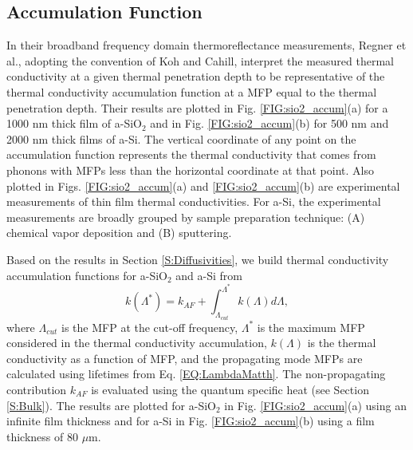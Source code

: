 \documentclass[aps,prb,twocolumn,superscriptaddress,footinbib,amsmath,amssymb,floatfix]{revtex4}
\begin{document}
\subsection{\label{S:Accumulation}Accumulation Function}

In their broadband frequency domain thermoreflectance 
measurements, Regner et al.,\cite{regner_broadband_2013}  
adopting the convention of Koh and Cahill,\cite{koh_frequency_2007} 
interpret the  
measured thermal conductivity at a given thermal penetration depth 
to be representative of the thermal conductivity accumulation 
function at a MFP equal to the thermal penetration depth.  
Their results are plotted in Fig. \ref{FIG:sio2_accum}(a) 
for a 1000 nm thick film of a-SiO$_2$ 
and in Fig. \ref{FIG:sio2_accum}(b) for 500 nm and 
2000 nm thick films of a-Si. The vertical coordinate 
of any point on the accumulation function represents the thermal 
conductivity that comes from phonons with MFPs less than the 
horizontal coordinate at that point. Also plotted in 
Figs. \ref{FIG:sio2_accum}(a) and \ref{FIG:sio2_accum}(b) 
are experimental measurements of thin film thermal 
conductivities. For a-Si, the experimental measurements are 
broadly grouped by sample preparation technique: 
(A) chemical vapor deposition
\cite{moon_thermal_2002,liu_high_2009,yang_anomalously_2010}
and (B) sputtering.
\cite{kuo_thermal_1992,cahill_thermal_1994,wada_thermal_1996} 

Based on the results in Section \ref{S:Diffusivities}, we build 
thermal conductivity accumulation functions for a-SiO$_2$ and a-Si 
from
\begin{equation}\label{EQ:kLambda}
k(\Lambda^{*}) = k_{AF} + 
\int^{\Lambda^{*}}_{\Lambda_{cut}} 
k(\Lambda)d\Lambda,
\end{equation}
where $\Lambda_{cut}$ is the MFP at the cut-off frequency, 
$\Lambda^*$ is the maximum MFP considered in the thermal 
conductivity accumulation, $k(\Lambda)$ is the thermal conductivity 
as a function of MFP,\cite{yang_mean_2013} 
and the propagating mode MFPs are 
calculated using lifetimes from Eq. \eqref{EQ:LambdaMatth}. The 
non-propagating contribution $k_{AF}$ is evaluated using the quantum 
specific heat (see Section \ref{S:Bulk}). 
The results are plotted for a-SiO$_2$ 
in Fig. \ref{FIG:sio2_accum}(a) using an infinite film thickness 
and for a-Si in Fig. \ref{FIG:sio2_accum}(b) using a film 
thickness of $80$ $\mu$m.\cite{mfp_fn3}  
\end{document}
